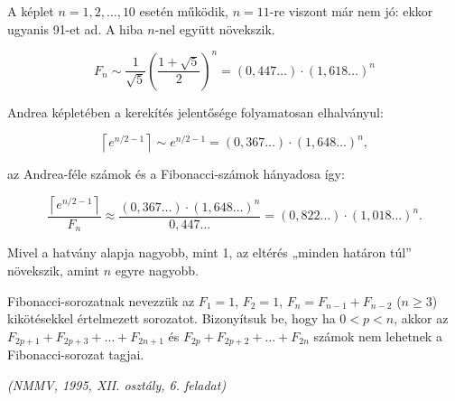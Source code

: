 \begin{solution}
A képlet $n=1,2,\ldots,10$ esetén működik, $n=11$-re viszont már
nem jó: ekkor ugyanis 91-et ad. A hiba $n$-nel együtt növekszik.

\[
F_{n}\sim\frac{1}{\sqrt{5}}\left(\frac{1+\sqrt{5}}{2}\right)^{n}=(0{,}447\ldots)\cdot(1{,}618\ldots)^{n}
\]

Andrea képletében a kerekítés jelentősége folyamatosan elhalványul:

\[
\left\lceil e^{n/2-1}\right\rceil \sim e^{n/2-1}=(0{,}367\ldots)\cdot(1{,}648\ldots)^{n},
\]

az Andrea-féle számok és a Fibonacci-számok hányadosa így:

\[
\frac{\left\lceil e^{n/2-1}\right\rceil }{F_{n}}\approx\frac{(0{,}367\ldots)\cdot(1{,}648\ldots)^{n}}{0{,}447\ldots}=(0{,}822\ldots)\cdot(1{,}018\ldots)^{n}.
\]

Mivel a hatvány alapja nagyobb, mint 1, az eltérés „minden határon
túl” növekszik, amint $n$ egyre nagyobb. 
\end{solution}
\begin{extraproblem}
Fibonacci-sorozatnak nevezzük az $F_{1}=1$, $F_{2}=1$, $F_{n}=F_{n-1}+F_{n-2}$
($n\ge3$) kikötésekkel értelmezett sorozatot. Bizonyítsuk be, hogy
ha $0<p<n$, akkor az $F_{2p+1}+F_{2p+3}+\ldots+F_{2n+1}$ és $F_{2p}+F_{2p+2}+\ldots+F_{2n}$
számok nem lehetnek a Fibonacci-sorozat tagjai. 
\begin{flushright}
\textit{(NMMV, 1995, XII. osztály, 6. feladat)} 
\par\end{flushright}
\end{extraproblem}

